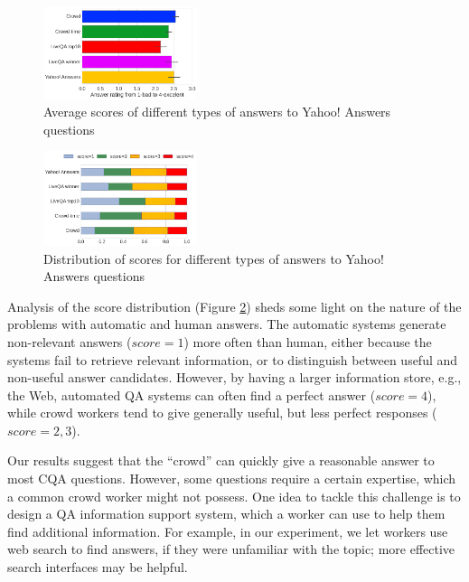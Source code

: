 \documentclass[11pt,letterpaper]{article}
\begin{document}
\begin{figure}[h]
	\centering
	\includegraphics[width=0.4\textwidth]{img/average_score}
	\caption{Average scores of different types of answers to Yahoo! Answers questions}
	\label{fig:average_score}
\end{figure}

\begin{figure}[h]
	\centering
	\includegraphics[width=0.4\textwidth]{img/scores_distribution}
	\caption{Distribution of scores for different types of answers to Yahoo! Answers questions}
	\label{fig:scores_distribution}
\end{figure}


Analysis of the score distribution (Figure \ref{fig:scores_distribution}) sheds some light on the nature of the problems with automatic and human answers. The automatic systems generate non-relevant answers ($score=1$) more often than human, either because the systems fail to retrieve relevant information, or to distinguish between useful and non-useful answer candidates. However, by having a larger information store, e.g., the Web, automated QA systems can often find a perfect answer ($score=4$), while crowd workers tend to give generally useful, but less perfect responses ($score=2,3$).

Our results suggest that the ``crowd'' can quickly give a reasonable answer to most CQA questions. However, some questions require a certain expertise, which a common crowd worker might not possess.
One idea to tackle this challenge is to design a QA information support system, which a worker can use to help them find additional information.
For example, in our experiment, we let workers use web search to find answers, if they were unfamiliar with the topic; more effective search interfaces may be helpful.
\end{document}
